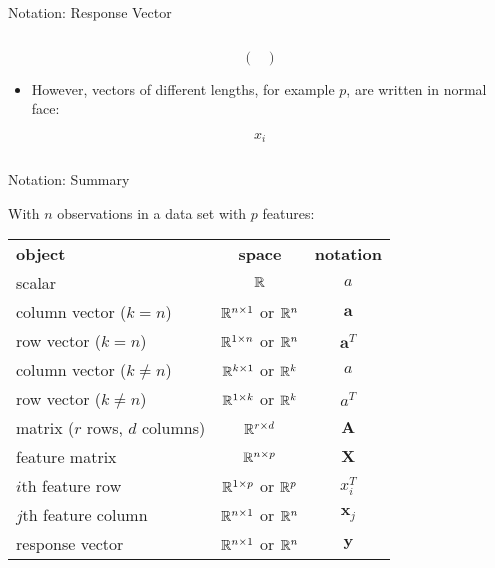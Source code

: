 \documentclass[mathserif, aspectratio=169]{beamer}
\begin{document}
\begin{frame}{Notation: Response Vector}
\begin{columns}[t]
\begin{column}{0.5\textwidth}
\begin{center}
\[\begin{pmatrix}
					\end{pmatrix}
				\]
			\end{center}
			\begin{itemize}
				\item However, vectors of different lengths, for example $p$, are written in
					normal face:
			\end{itemize}
			\vspace{-9mm}
			\begin{center}
				\[ x_i \]
			\end{center}
		\end{column}
	\end{columns}
\end{frame}

\begin{frame}{Notation: Summary}
	\begin{popblock}{0.6\textwidth}{With $n$ observations in a data set with $p$ features:}
		\begin{tabular}[h]{lcc}
			{\bfseries\blue object} & {\bfseries\blue space} & {\bfseries\blue notation} \\
			scalar & $\mathbb{R}$ & $a$ \\
			column vector ($k = n$)  & $\mathbb{R}^{n \times 1}$ or $\mathbb{R}^n$ & $\bm{a}$ \\
			row vector ($k = n$)  & $\mathbb{R}^{1 \times n}$ or $\mathbb{R}^n$ & $\bm{a}^T$ \\
			column vector ($k \ne n$)  & $\mathbb{R}^{k \times 1}$ or $\mathbb{R}^k$ & $a$ \\
			row vector ($k \ne n$)  & $\mathbb{R}^{1 \times k}$ or $\mathbb{R}^k$ & $a^T$ \\
			matrix ($r$ rows, $d$ columns) & $\mathbb{R}^{r\times d}$ & $\bm{A}$ \\
			\hline
			feature matrix & $\mathbb{R}^{n\times p}$ & $\bm{X}$ \\
			$i$th feature row & $\mathbb{R}^{1\times p}$ or $\mathbb{R}^p$ & $x_i^T$ \\
			$j$th feature column & $\mathbb{R}^{n\times 1}$ or $\mathbb{R}^n$ & $\bm{x}_j$ \\
			response vector & $\mathbb{R}^{n\times 1}$ or $\mathbb{R}^n$ & $\bm{y}$ \\
		\end{tabular}
	\end{popblock}
\end{frame}
\end{document}
